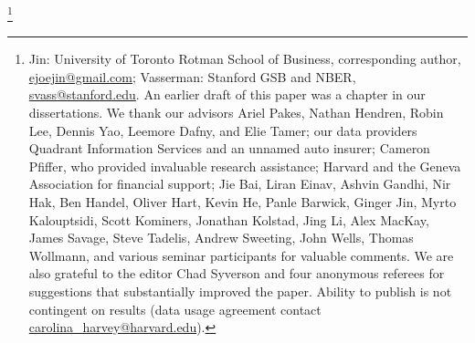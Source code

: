 \thanks{
Jin: University of Toronto Rotman School of Business, corresponding author,
\protect\href{mailto:ejoejin@gmail.com}{ejoejin@gmail.com};
Vasserman: Stanford GSB and NBER,
\protect\href{mailto:svass@stanford.edu}{svass@stanford.edu}.
An earlier draft of this paper was a chapter in our dissertations. We thank our advisors Ariel Pakes, Nathan Hendren, Robin Lee, Dennis Yao, Leemore Dafny, and Elie Tamer; our data providers Quadrant Information Services and an unnamed auto insurer; Cameron Pfiffer, who provided invaluable research assistance; Harvard and the Geneva Association for financial support;
Jie Bai,
Liran Einav, Ashvin Gandhi, Nir Hak, Ben Handel, Oliver Hart, Kevin He, Panle Barwick, Ginger Jin, Myrto Kalouptsidi, Scott Kominers, Jonathan Kolstad, Jing Li, Alex MacKay,
James Savage, Steve Tadelis, Andrew Sweeting, John Wells, Thomas Wollmann, and various seminar participants for valuable comments. We are also grateful to the editor Chad Syverson and four anonymous referees for suggestions that substantially improved the paper.
Ability to publish is not contingent on results (data usage agreement contact
 \protect\href{mailto:carolina_harvey@harvard.edu}{carolina\_harvey@harvard.edu}).
}